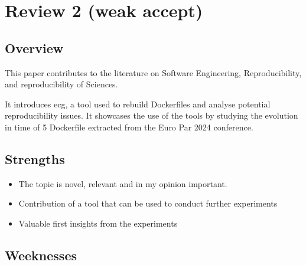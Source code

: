 \documentclass[%
	11pt,
	final,
]{article}
\begin{document}
\section{Review 2 (weak accept)}

\subsection{Overview}

This paper contributes to the literature on Software Engineering, Reproducibility, and reproducibility of Sciences.

It introduces ecg, a tool used to rebuild Dockerfiles and analyse potential reproducibility issues.
It showcases the use of the tools by studying the evolution in time of 5 Dockerfile extracted from the Euro Par 2024 conference.

\subsection{Strengths}

\begin{itemize}
\item The topic is novel, relevant and in my opinion important. 
\item Contribution of a tool that can be used to conduct further experiments
\item Valuable first insights from the experiments
\end{itemize}

\subsection{Weeknesses}
 
\end{document}
